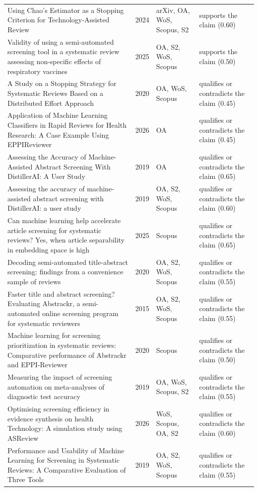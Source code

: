 \begin{longtable}{@{}%
  >{\raggedright\arraybackslash}p{}c%
  >{\raggedright\arraybackslash}p{}%
  >{\raggedright\arraybackslash}p{}@{}}
Using Chao's Estimator as a Stopping Criterion for Technology-Assisted Review & 2024 & arXiv, OA, WoS, Scopus, S2 & supports the claim (0.60) \\
Validity of using a semi-automated screening tool in a systematic review assessing non-specific effects of respiratory vaccines & 2025 & OA, S2, WoS, Scopus & supports the claim (0.50) \\
A Study on a Stopping Strategy for Systematic Reviews Based on a Distributed Effort Approach & 2020 & OA, WoS, Scopus & qualifies or contradicts the claim (0.45) \\
Application of Machine Learning Classifiers in Rapid Reviews for Health Research: A Case Example Using EPPIReviewer & 2026 & OA & qualifies or contradicts the claim (0.45) \\
Assessing the Accuracy of Machine-Assisted Abstract Screening With DistillerAI: A User Study & 2019 & OA & qualifies or contradicts the claim (0.65) \\
Assessing the accuracy of machine-assisted abstract screening with DistillerAI: a user study & 2019 & OA, S2, WoS, Scopus & qualifies or contradicts the claim (0.60) \\
Can machine learning help accelerate article screening for systematic reviews? Yes, when article separability in embedding space is high & 2025 & Scopus & qualifies or contradicts the claim (0.65) \\
Decoding semi-automated title-abstract screening: findings from a convenience sample of reviews & 2020 & OA, S2, WoS, Scopus & qualifies or contradicts the claim (0.55) \\
Faster title and abstract screening? Evaluating Abstrackr, a semi-automated online screening program for systematic reviewers & 2015 & OA, S2, WoS, Scopus & qualifies or contradicts the claim (0.55) \\
Machine learning for screening prioritization in systematic reviews: Comparative performance of Abstrackr and EPPI-Reviewer & 2020 & Scopus & qualifies or contradicts the claim (0.50) \\
Measuring the impact of screening automation on meta-analyses of diagnostic test accuracy & 2019 & OA, WoS, Scopus, S2 & qualifies or contradicts the claim (0.55) \\
Optimising screening efficiency in evidence synthesis on health Technology: A simulation study using ASReview & 2026 & WoS, Scopus, OA, S2 & qualifies or contradicts the claim (0.60) \\
Performance and Usability of Machine Learning for Screening in Systematic Reviews: A Comparative Evaluation of Three Tools & 2019 & OA, S2, WoS, Scopus & qualifies or contradicts the claim (0.55) \\

\end{longtable}
